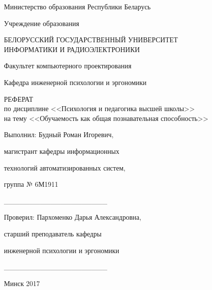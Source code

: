 \begin{titlepage}
\thispagestyle{empty}
\setlength{\parindent}{0cm} %

{\centering{}
  Министерство образования Республики Беларусь

  \smallskip
  Учреждение образования

  БЕЛОРУССКИЙ ГОСУДАРСТВЕННЫЙ УНИВЕРСИТЕТ \\
  ИНФОРМАТИКИ И РАДИОЭЛЕКТРОНИКИ

  \smallskip
  Факультет компьютерного проектирования

  \smallskip
  Кафедра инженерной психологии и эргономики\par
}

\vspace{50mm}

{\centering{}
  РЕФЕРАТ \\
  по дисциплине <<Психология и педагогика высшей школы>> \\
  на тему <<Обучаемость как общая познавательная способность>>\par
}

\vspace{30mm}

\begin{minipage}{.1\linewidth}
\end{minipage}
\hfill
\begin{minipage}{.8\linewidth}
  Выполнил: Будный Роман Игоревич,

  \hspace{2.4cm} магистрант кафедры информационных

  \hspace{2.4cm} технологий автоматизированных систем,

  \hspace{2.4cm} группа № 6М1911

  \hspace{2.4cm} \_\_\_\_\_\_\_\_\_\_\_\_\_\_\_\_\_\_\_\_

  \bigskip
  Проверил:\; Пархоменко Дарья Александровна,

  \hspace{2.4cm} старший преподаватель кафедры

  \hspace{2.4cm} инженерной психологии и эргономики

  \hspace{2.4cm} \_\_\_\_\_\_\_\_\_\_\_\_\_\_\_\_\_\_\_\_
\end{minipage}

\vfill
{\centering{}
  Минск 2017\par
}

\setlength{\parindent}{1.25cm} %
\end{titlepage}
